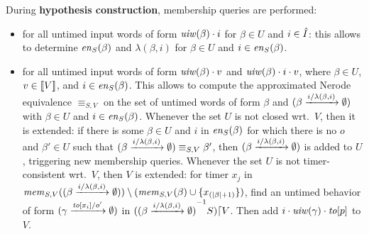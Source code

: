 During {\bf hypothesis construction}, membership queries are performed:
\begin{itemize}
\item for all untimed input words of form $\untimedinputword(\beta) \cdot i$
   for $\beta \in U$ and $i \in \extinputs$: this allows to determine
   $\feasibleinputs{\beta}{S}$ and $\lambda(\beta,i)$
   for $\beta \in U$ and $i \in \feasibleinputs{\beta}{S}$.
\item
  for all untimed input words of form $\untimedinputword(\beta) \cdot v$ and
  $\untimedinputword(\beta) \cdot i \cdot v$, where
  $\beta \in U$, $v \in \instancesof{V}$, and
  $i \in \feasibleinputs{\beta}{S}$.
    This allows to compute the approximated Nerode equivalence $\equiv_{S,V}$ on
    the set of untimed words of form $\beta$ and
    $\extend{\beta}{i}{\lambda(\beta,i)}$ with
    $\beta \in U$ and $i \in \feasibleinputs{\beta}{S}$.
    Whenever the set $U$ is not closed wrt.\ $V$, then it is extended:
if there is some $\beta \in U$ and $i$ in $\feasibleinputs{\beta}{S}$
for which there is no $o$ and $\beta' \in U$ such that
$\extend{\beta}{i}{\lambda(\beta,i)} \equiv_{S,V} \beta'$, 
then $\extend{\beta}{i}{\lambda(\beta,i)}$ is added to $U$,
triggering new membership queries.
Whenever the set $U$ is not timer-consistent wrt.\ $V$, then $V$ is extended:
for timer $x_j$ in
$\apprgetmemorable{S}{\extend{\beta}{i}{\lambda(\beta,i)}}{V} \setminus (\apprgetmemorable{S}{\beta}{V} \cup \set{x_{(|\beta|+1)}})$, find an 
untimed behavior of form $\extend{\gamma}{\toevent{x_i}}{o'}$ in
$\apprsuffixbehs{S}{\extend{\beta}{i}{\lambda(\beta,i)}}{V}$.
Then add $i\cdot\untimedinputword(\gamma)\cdot\toevent{p}$ to $V$.
\end{itemize}

